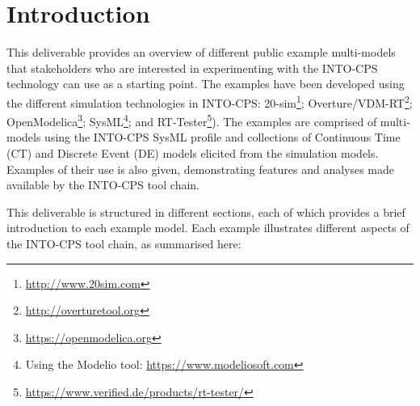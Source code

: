 
\section{Introduction}\label{sec:intro}

This deliverable provides an overview of different public example multi-models that stakeholders who are interested in experimenting with the INTO-CPS technology can use as a starting point. The examples have been developed using the different simulation technologies in INTO-CPS: 20-sim\footnote{\url{http://www.20sim.com}}; Overture/VDM-RT\footnote{\url{http://overturetool.org}}; OpenModelica\footnote{\url{https://openmodelica.org}}; SysML\footnote{Using the Modelio tool: \url{https://www.modeliosoft.com}}; and RT-Tester\footnote{\url{https://www.verified.de/products/rt-tester/}}). The examples are  comprised of multi-models using the INTO-CPS SysML profile and collections of Continuous Time (CT) and Discrete Event (DE) models elicited from the simulation models. Examples of their use is also given, demonstrating features and analyses made available by the INTO-CPS tool chain. 

This deliverable is structured in different sections, each of which provides a brief introduction to each example model. Each example illustrates different aspects of the INTO-CPS tool chain, as summarised here:


